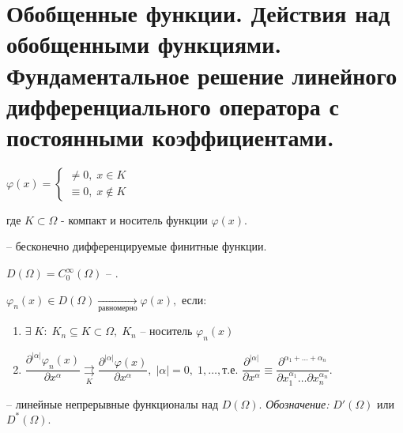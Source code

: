 \chapter{Обобщенные функции. Действия над обобщенными функциями. Фундаментальное решение линейного дифференциального оператора с постоянными коэффициентами.}
\label{cha:14}

\begin{definition}
	$\varphi(x) =
	\begin{cases}
		\neq 0, \; x \in K\\
		\equiv 0, \; x \notin K
	\end{cases}$
	
	где $K \subset \Omega $ - компакт и носитель функции $ \varphi(x) .$
\end{definition}

\begin{definition}
	 -- бесконечно дифференцируемые финитные функции.
\end{definition}

\begin{definition}
	$ D(\Omega) = C_0^{\infty}(\Omega) $ -- .
\end{definition}

\begin{definition}
	$ \varphi_n(x) \in D(\Omega) \underset{\text{равномерно}}{\longrightarrow} \varphi(x), $ если:
	\begin{enumerate}
		\item $ 
			\exists \; K: \; K_n \subseteq K \subset \Omega, \; K_n $ -- носитель $ \varphi_n(x)$
		\item 
			$ \dfrac{\partial^{|\alpha|}\varphi_n(x)}{\partial x^{\alpha}} \underset{K}{\rightrightarrows} \dfrac{\partial^{|\alpha|}\varphi(x)}{\partial x^{\alpha}}, \; |\alpha| = 0,\; 1, \ldots, \text{т.е. } \dfrac{\partial^{|\alpha|}}{\partial x^{\alpha}} \equiv \dfrac{\partial^{\alpha_1 + \ldots + \alpha_n}}{\partial x_1^{\alpha_1}\ldots\partial x_n^{\alpha_n}}.$
	\end{enumerate}
\end{definition}

\begin{definition}
	 -- линейные непрерывные функционалы над $ D(\Omega). $ \textit{Обозначение: } $ D'(\Omega) $ или $ D^{*}(\Omega) .$
\end{definition}

